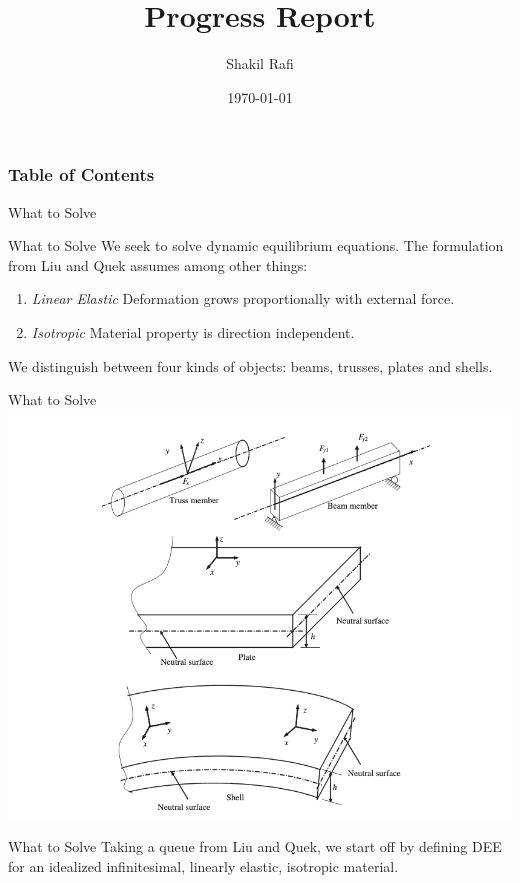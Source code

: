 \documentclass{beamer}
\title[Short title]{Progress Report}
\author{Shakil Rafi}
\institute[University of Arkansas] 
{
University of Arkansas \\ 
\medskip
}
\date{\today}
\begin{document}
\nocite{*}
\begin{frame}
\titlepage 
\end{frame}

\begin{frame}
\frametitle{Table of Contents} 
    \tableofcontents 
\end{frame}
\begin{section}{What to Solve}
\begin{frame}{What to Solve}
    We seek to solve dynamic equilibrium equations. The formulation from Liu and Quek assumes among other things:
    \begin{enumerate}
        \item \textit{Linear Elastic} Deformation grows proportionally with external force.
        \item \textit{Isotropic} Material property is direction independent.
    \end{enumerate}
    We distinguish between four kinds of objects: beams, trusses, plates and shells.
\end{frame}
\begin{frame}{What to Solve}
    \includegraphics[scale = 0.35]{TypesOfObjects.png}
\end{frame}
\begin{frame}{What to Solve}
    Taking a queue from Liu and Quek, we start off by defining DEE for an idealized infinitesimal, linearly elastic, isotropic material.

\end{frame}
\end{section}
\end{document}
